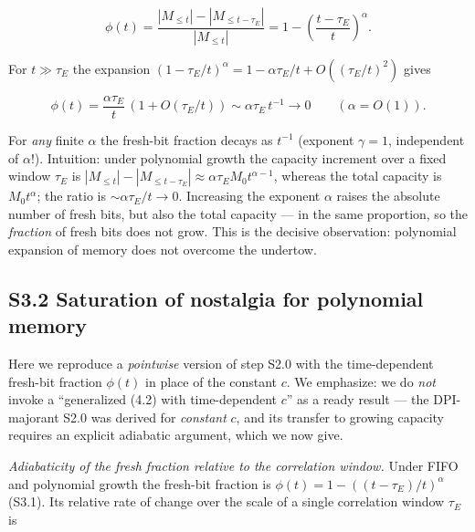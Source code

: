 \documentclass[12pt]{iopart}
\begin{document}
\begin{equation}\phi(t) = \frac{|M_{\le t}| - |M_{\le t-\tau_E}|}{|M_{\le t}|} = 1 - \left(\frac{t-\tau_E}{t}\right)^\alpha. \tag{S3.1}\end{equation}



For \(t \gg \tau_E\) the expansion \((1-\tau_E/t)^\alpha = 1 - \alpha\tau_E/t + O((\tau_E/t)^2)\) gives



\begin{equation}\phi(t) = \frac{\alpha\tau_E}{t}\,(1 + O(\tau_E/t)) \sim \alpha\tau_E\,t^{-1} \to 0 \qquad (\alpha = O(1)). \tag{S3.2}\end{equation}



For \emph{any} finite \(\alpha\) the fresh-bit fraction decays as \(t^{-1}\) (exponent \(\gamma = 1\), independent of \(\alpha\)!). Intuition: under polynomial growth the capacity increment over a fixed window \(\tau_E\) is \(|M_{\le t}| - |M_{\le t-\tau_E}| \approx \alpha\tau_E M_0 t^{\alpha-1}\), whereas the total capacity is \(M_0 t^\alpha\); the ratio is \(\sim \alpha\tau_E/t \to 0\). Increasing the exponent \(\alpha\) raises the absolute number of fresh bits, but also the total capacity --- in the same proportion, so the \emph{fraction} of fresh bits does not grow. This is the decisive observation: polynomial expansion of memory does not overcome the undertow.



\subsection{S3.2 Saturation of nostalgia for polynomial memory}\label{s3.2-saturation-of-nostalgia-for-polynomial-memory}



Here we reproduce a \emph{pointwise} version of step S2.0 with the time-dependent fresh-bit fraction \(\phi(t)\) in place of the constant \(c\). We emphasize: we do \emph{not} invoke a ``generalized (4.2) with time-dependent \(c\)'' as a ready result --- the DPI-majorant S2.0 was derived for \emph{constant} \(c\), and its transfer to growing capacity requires an explicit adiabatic argument, which we now give.



\emph{Adiabaticity of the fresh fraction relative to the correlation window.} Under FIFO and polynomial growth the fresh-bit fraction is \(\phi(t) = 1-((t-\tau_E)/t)^\alpha\) (S3.1). Its relative rate of change over the scale of a single correlation window \(\tau_E\) is
\end{document}
